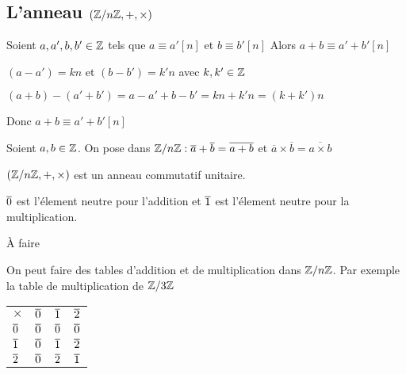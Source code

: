 \documentclass[a4paper, 12pt]{article}
\begin{document}
\subsection{L'anneau $(\mathbb{Z}/n\mathbb{Z}, +, \times)$}

\begin{proposition}
    Soient $a, a', b, b' \in \mathbb{Z}$ tels que $a \equiv a' [n]$ et $b \equiv b' [n]$
    Alors $a + b \equiv a' + b' [n]$
\end{proposition}

\begin{demonstration}
    \item $(a - a') = kn$ et $(b - b') = k'n$ avec $k, k' \in \mathbb{Z}$

    \item $(a + b) - (a' + b') = a - a' + b - b' = kn + k'n = (k + k')n$

    \begin{rdem}
        \item Donc $a + b \equiv a' + b' [n]$
    \end{rdem}
\end{demonstration}

\begin{definition}
    Soient $a, b \in \mathbb{Z}$. On pose dans $\mathbb{Z}/n\mathbb{Z}: \overline{a} + \overline{b} = \overline{a + b}$ et $\overline{a} \times \overline{b} = \overline{a \times b}$
\end{definition}

\begin{proposition}
    $(\mathbb{Z}/n\mathbb{Z}, +, \times)$ est un anneau commutatif unitaire.

    $\overline{0}$ est l'élement neutre pour l'addition et $\overline{1}$ est l'élement neutre pour la multiplication.
\end{proposition}

\begin{demonstration}
    À faire
\end{demonstration}


\begin{example}
    On peut faire des tables d'addition et de multiplication dans $\mathbb{Z}/n\mathbb{Z}$.
    Par exemple la table de multiplication de $\mathbb{Z}/3\mathbb{Z}$
    \begin{table}[ht]
        \begin{tabular}{|l|l|l|l|}
        \hline
        $\times$  & $\overline{0}$ & $\overline{1}$ & $\overline{2}$ \\
        $\overline{0}$ & $\overline{0}$ & $\overline{0}$ & $\overline{0}$ \\
        $\overline{1}$ & $\overline{0}$ & $\overline{1}$ & $\overline{2}$ \\
        $\overline{2}$ & $\overline{0}$ & $\overline{2}$ & $\overline{1}$ \\ \hline
        \end{tabular}
    \end{table}
\end{example}
\end{document}
